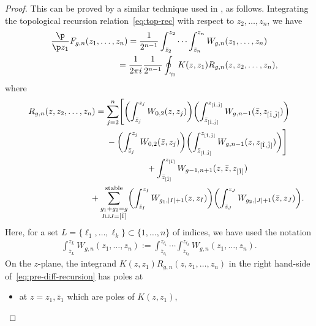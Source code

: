 \begin{proof}
This can be proved by a similar technique used in
\cite[Theorem~4.7]{DM14}, as follows. Integrating
the topological recursion relation~\eqref{eq:top-rec}
with respect to $z_{2}, \dots, z_{n}$, we have
\begin{gather}
\frac{\p}{\p z_{1}} F_{g,n}(z_{1},\dots,z_{n})  =
\frac{1}{2^{n-1}}\int_{\bar{z}_{2}}^{z_{2}} \cdots
\int_{\bar{z}_{n}}^{z_{n}} W_{g,n}(z_{1},\dots,z_{n})\nonumber \\
\hphantom{\frac{\p}{\p z_{1}} F_{g,n}(z_{1},\dots,z_{n})}{}
=
\frac{1}{2\pi i} \frac{1}{2^{n-1}} \oint_{\gamma_{0}}
K(z,z_{1}) R_{g,n}(z,z_{2},\dots,z_{n}), \label{eq:pre-diff-recursion}
\end{gather}
where
\begin{gather*}
R_{g,n}(z,z_{2},\dots,z_{n}) =
\sum_{j=2}^{n}
\Biggl[ \biggl(\int^{z_{j}}_{\bar{z}_{j}}W_{0,2}(z,z_{j}) \biggr)
\biggl(\int^{z_{[\hat{1}, \hat{j}]}}_{\bar{z}_{[\hat{1}, \hat{j}]}}
W_{g,n-1}(\bar{z}, z_{[\hat{1},\hat{j}]}) \biggr)\\
\hphantom{R_{g,n}(z,z_{2},\dots,z_{n}) =}{}
- \biggl(\int^{z_{j}}_{\bar{z}_{j}}W_{0,2}(\bar{z},z_{j}) \biggr)
\biggl(\int^{z_{[\hat{1}, \hat{j}]}}_{\bar{z}_{[\hat{1}, \hat{j}]}}
W_{g,n-1}(z, z_{[\hat{1},\hat{j}]})
\biggr) \Biggr]
\\
\hphantom{R_{g,n}(z,z_{2},\dots,z_{n}) =}{}
+ \int^{z_{[\hat{1}]}}_{\bar{z}_{[\hat{1}]}}
W_{g-1,n+1}(z,\bar{z},z_{[\hat{1}]})\\
\hphantom{R_{g,n}(z,z_{2},\dots,z_{n}) =}{}
 + \sum_{\substack{g_{1}+g_{2}=g \\
 I \sqcup J = [\hat{1}]}}^{\text{stable}}
\biggl( \int^{z_{I}}_{\bar{z}_{I}}
W_{g_{1}, |I|+1}(z,z_{I}) \biggr)
\biggl( \int^{z_{J}}_{\bar{z}_{J}}
W_{g_{2}, |J|+1}(\bar{z}, z_{J})
\biggr).
\end{gather*}
Here, for a set $L =\{\ell_{1}, \dots, \ell_{k} \}
\subset \{1,\dots,n \}$ of indices, we have used the notation
\begin{gather*}
\int^{z_{L}}_{\bar{z}_{L}} W_{g,n}(z_{1},\dots,z_{n}) :=
\int^{z_{\ell_{1}}}_{\bar{z}_{\ell_{1}}} \cdots
\int^{z_{\ell_{k}}}_{\bar{z}_{\ell_{k}}} W_{g,n}(z_{1},\dots,z_{n}).
\end{gather*}
On the $z$-plane, the integrand
$K(z,z_{1})R_{g,n}(z,z_{1},\dots,z_{n})$
in the right hand-side of~\eqref{eq:pre-diff-recursion}
has poles at
\begin{itemize}\itemsep=0pt
\item
at $z = z_{1}, \bar{z}_{1}$ which are poles of $K(z,z_{1})$,

\end{itemize}
\end{proof}
